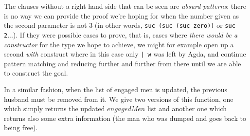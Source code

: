 {The clauses without a right hand side that can be seen are \emph{absurd patterns}: there is no way we can provide the proof we're hoping for when the number given as the second parameter is not 3 (in other words, \texttt{suc (suc (suc zero))} or \texttt{suc 2}...). If they were possible cases to prove, that is, cases where \emph{there would be a constructor} for the type we hope to achieve, we might for example open up a second \emph{with} construct where in this case only \texttt{| w} was left by Agda, and continue pattern matching and reducing further and further from there until we are able to construct the goal.

In a similar fashion, when the list of engaged men is updated, the previous husband must be removed from it. We give two versions of this function, one which simply returns the updated $engagedMen$ list and another one which returns also some extra information (the man who was dumped and goes back to being free).

}
